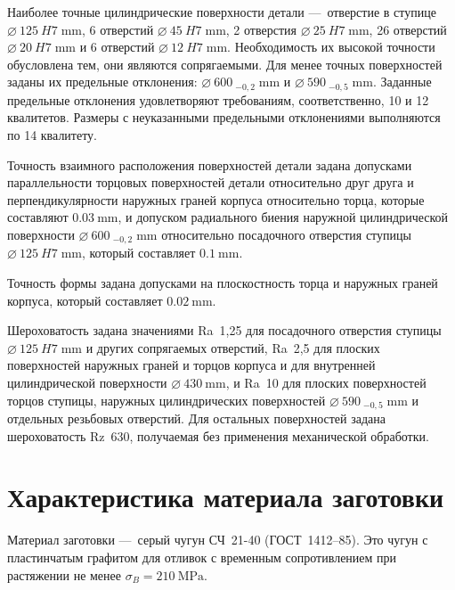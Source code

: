 \documentclass[14pt,russian,a4paper]{extreport}
\begin{document}
Наиболее точные цилиндрические поверхности детали --- отверстие в ступице $\SI{125}[\diameter]{H7 \; \milli\meter}$, 6 отверстий $\SI{45}[\diameter]{H7 \; \milli\meter}$, 2 отверстия $\SI{25}[\diameter]{H7 \; \milli\meter}$, 26 отверстий $\SI{20}[\diameter]{H7 \; \milli\meter}$ и 6 отверстий $\SI{12}[\diameter]{H7 \; \milli\meter}$. Необходимость их высокой точности обусловлена тем, они являются сопрягаемыми. Для менее точных поверхностей заданы их предельные отклонения: $\SI{600}[\diameter]{_{-0,2} \; \milli\meter}$ и $\SI{590}[\diameter]{_{-0,5} \; \milli\meter}$. Заданные предельные отклонения удовлетворяют требованиям, соответственно, 10 и 12 квалитетов. Размеры с неуказанными предельными отклонениями выполняются по 14 квалитету. \par

Точность взаимного расположения поверхностей детали задана допусками параллельности торцовых поверхностей детали относительно друг друга и перпендикулярности наружных граней корпуса относительно торца, которые составляют $\SI{0,03}{\milli\meter}$, и допуском радиального биения наружной цилиндрической поверхности $\SI{600}[\diameter]{_{-0,2} \; \milli\meter}$ относительно посадочного отверстия ступицы $\SI{125}[\diameter]{H7 \; \milli\meter}$, который составляет $\SI{0,1}{\milli\meter}$. \par

Точность формы задана допусками на плоскостность торца и наружных граней корпуса, который составляет $\SI{0,02}{\milli\meter}$. \par

Шероховатость задана значениями Ra~1,25 для посадочного отверстия ступицы $\SI{125}[\diameter]{H7 \; \milli\meter}$ и других сопрягаемых отверстий, Ra~2,5 для плоских поверхностей наружных граней и торцов корпуса и для внутренней цилиндрической поверхности $\SI{430}[\diameter]{\milli\meter}$, и Ra~10 для плоских поверхностей торцов ступицы, наружных цилиндрических поверхностей $\SI{590}[\diameter]{_{-0,5} \; \milli\meter}$ и отдельных резьбовых отверстий. Для остальных поверхностей задана шероховатость Rz~630, получаемая без применения механической обработки.


\section{Характеристика материала заготовки}

Материал заготовки --- серый чугун СЧ~21-40 (ГОСТ~1412--85). Это чугун с пластинчатым графитом для отливок с временным сопротивлением при растяжении не менее $\sigma_B = \SI{210}{\mega\pascal}$. \par
\end{document}

